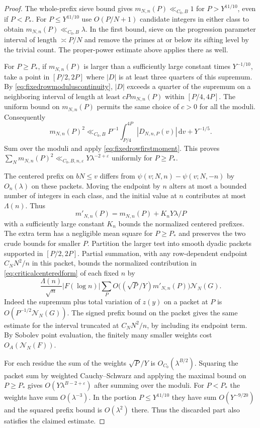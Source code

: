 \documentclass[11pt,a4paper]{article}
\numberwithin{equation}{section}
\newcommand{\ud}{\mathrm d}
\newcommand{\NN}{\mathcal N_N}
\begin{document}
\begin{proof}
The whole-prefix sieve bound gives $m_{N,n}(P)\ll_{C_0,B}1$
for $P>Y^{11/10}$, even if $P<P_*$. For $P\le Y^{11/10}$
use $O(P/N+1)$ candidate integers in either class to
obtain $m_{N,n}(P)\ll_{C_0,B}\lambda$.
In the first bound, sieve on the progression parameter
interval of length $\asymp P/N$ and remove the primes at
or below its sifting level by the trivial count. The
proper-power estimate above applies there as well.

For $P\ge P_*$, if $m_{N,n}(P)$ is larger than a sufficiently
large constant times $Y^{-1/10}$, take a point in $[P/2,2P]$
where $|D|$ is at least three quarters of this supremum.
By \cref{eq:fixedrowmoduluscontinuity}, $|D|$ exceeds a
quarter of the supremum on a neighboring interval of length
at least $cP m_{N,n}(P)$ within $[P/4,4P]$. The uniform
bound on $m_{N,n}(P)$ permits the same choice of $c>0$
for all the moduli. Consequently
\[
 m_{N,n}(P)^2
      \ll_{C_0,B} P^{-1}\int_{P/4}^{4P}|D_{N,n,P}(v)|\,\ud v
                       +Y^{-1/5}.
\]
Sum over the moduli and apply \cref{eq:fixedrowfirstmoment}.
This proves $\sum_N m_{N,n}(P)^2
\ll_{C_0,B,n,\varepsilon}Y\lambda^{-2+\varepsilon}$ uniformly
for $P\ge P_*$.

The centered prefix on $bN\le v$ differs from
$\psi(v;N,n)-\psi(v;N,-n)$ by $O_n(\lambda)$ on these
packets. Moving the endpoint by $n$ alters at most a
bounded number of integers in each class, and the initial
value at $n$ contributes at most $\Lambda(n)$. Thus
\[
 m'_{N,n}(P)=m_{N,n}(P)+K_nY\lambda/P
\]
with a sufficiently large constant $K_n$ bounds the normalized
centered prefixes. The extra term has a negligible mean
square for $P\ge P_*$ and preserves the two crude bounds
for smaller $P$.
Partition the larger test into smooth dyadic packets
supported in $[P/2,2P]$. Partial summation, with any
row-dependent endpoint $C_NN^2/n$ in this packet, bounds
the normalized contribution in \cref{eq:criticalcenteredform}
of each fixed $n$ by
\[
 \frac{\Lambda(n)}{\sqrt n}|F(\log n)|
       \sum_P O\bigl((\sqrt P/Y)m'_{N,n}(P)\bigr)\NN(G).
\]
Indeed the supremum plus total variation of
$z(y)$ on a packet at $P$ is $O(P^{-1/2}\NN(G))$.
The signed prefix bound on the packet gives the same
estimate for the interval truncated at $C_NN^2/n$, by
including its endpoint term. By Sobolev point evaluation,
the finitely many smaller weights cost $O_A(\NN(F))$.

For each residue the sum of the weights $\sqrt P/Y$ is
$O_{C_0}(\lambda^{B/2})$. Squaring the packet sum by weighted
Cauchy--Schwarz and applying the maximal bound on
$P\ge P_*$ gives $O(Y\lambda^{B-2+\varepsilon})$ after
summing over the moduli. For $P<P_*$ the weights have
sum $O(\lambda^{-3})$. In the portion $P\le Y^{11/10}$
they have sum $O(Y^{-9/20})$ and the squared prefix
bound is $O(\lambda^2)$ there. Thus the discarded part
also satisfies the claimed estimate.


\end{proof}
\end{document}
